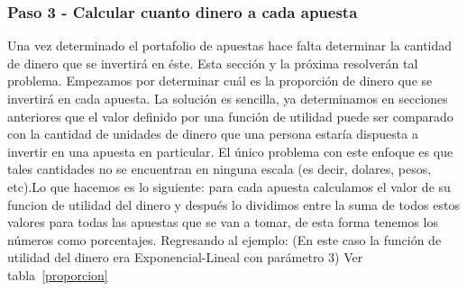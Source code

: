 \begin{table}[ht]
\centering
{}
\caption{Escogiendo apuestas que vale la pena realizar}
\label{seleccion}
\end{table}

\subsubsection{Paso 3 - Calcular cuanto dinero a cada apuesta}
\label{sec:paso-3}

Una vez determinado el portafolio de apuestas hace falta determinar la cantidad de dinero que se invertirá en éste. Esta sección y la próxima resolverán tal problema.
 Empezamos por determinar cuál es la proporción de dinero que se invertirá en cada apuesta. La solución es sencilla, ya determinamos en secciones anteriores que el valor definido por una función de utilidad puede ser comparado con la cantidad de unidades de dinero que una persona estaría dispuesta a invertir en una apuesta en particular. El único problema con este enfoque es que tales cantidades no se encuentran en ninguna escala (es decir, dolares, pesos, etc).Lo que hacemos es lo siguiente: para cada apuesta calculamos el valor de su funcion de utilidad del dinero y después lo dividimos entre la suma de todos estos valores para todas las apuestas que se van a tomar, de esta forma tenemos los números como porcentajes.
 Regresando al ejemplo: (En este caso la función de utilidad del dinero era Exponencial-Lineal con parámetro 3)
Ver tabla~\ref{proporcion}

